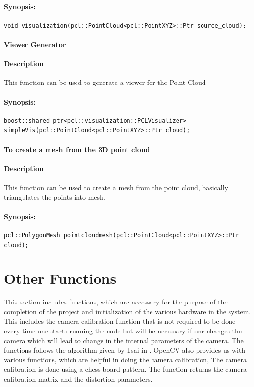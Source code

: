 \paragraph{Synopsis:}
\begin{lstlisting}
void visualization(pcl::PointCloud<pcl::PointXYZ>::Ptr source_cloud);
\end{lstlisting}


\paragraph{ Viewer Generator}
\paragraph{Description}
This function can be used to generate a viewer for the Point Cloud
\paragraph{Synopsis:}
\begin{lstlisting}
boost::shared_ptr<pcl::visualization::PCLVisualizer> simpleVis(pcl::PointCloud<pcl::PointXYZ>::Ptr cloud);
\end{lstlisting}


\paragraph{  To create a mesh from the 3D point cloud }
\paragraph{Description}
 This function can be used to create a mesh from the point cloud, basically triangulates the points into mesh.
\paragraph{Synopsis:}
\begin{lstlisting}
pcl::PolygonMesh pointcloudmesh(pcl::PointCloud<pcl::PointXYZ>::Ptr cloud);
\end{lstlisting}

\section{Other Functions}
This section includes functions, which are necessary for the purpose of the completion of the project and initialization of the various hardware
in the system. This includes the camera calibration function that is not required to be done every time one starts running the code but will be necessary if one changes the camera which will lead to change in the internal parameters of the camera. The functions follows the algorithm given by Tsai in \cite{horn2000tsai}. OpenCV also provides us with various functions, which are helpful in doing the camera calibration, The camera calibration is done using a chess board pattern. The function returns the camera calibration matrix and the distortion parameters.

